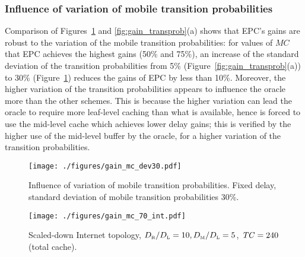 \documentclass[conference]{IEEEtran}
\newcommand{\mynote}[1]{{{\medskip
\footnotesize \em \noindent Note: #1}}\medskip}
\newcommand{\mynotex}[1]{}
\renewcommand{\mynote}[1]{}
\newcommand{\M}{\mbox{\tiny M}}
\newcommand{\Leaf}{\mbox{\tiny L}}
\newcommand{\R}{\mbox{\tiny R}}
\newcommand{\TC}{\mbox{\emph{TC}}}
\begin{document}
\mynotex{
\begin{itemize}
\item how is gain estimated in the transient graph: average of delays then take ratio to get gain
\item identify when 95\% of steady state value is reached: approx 750 for $\gamma=0.5$ and 490 for $\gamma=8$
\end{itemize}
}

\subsubsection{Influence of variation of mobile transition probabilities} Comparison of Figures~\ref{fig:gain_var_trans} and \ref{fig:gain_transprob}(a) shows that  EPC's   gains  are robust to the variation of the mobile transition probabilities: for values of $MC$ that EPC achieves the highest gains (50\% and 75\%), an increase of the standard deviation of the  transition probabilities from 5\% (Figure~\ref{fig:gain_transprob}(a)) to 30\% (Figure~\ref{fig:gain_var_trans}) reduces the gains of EPC by less than 10\%.
 Moreover, the higher variation of the  transition probabilities appears to influence the oracle  more than the other schemes.
This is because the higher variation can lead the oracle to require more leaf-level caching than what is  available, hence is forced to use the mid-level cache which achieves lower delay gains; this is verified by the higher use of the mid-level buffer by the oracle, for a higher variation of the transition probabilities.


\mynote{
\begin{itemize}
\item Add note that this is verified by the increased utilization of the mid-level cache for the oracle.
\end{itemize}
}


\begin{figure}[tb]
\centering
\texttt{[image: ./figures/gain\_mc\_dev30.pdf]}
\vspace{-0.1in}
\caption{Influence of variation of mobile transition probabilities. Fixed delay, standard deviation of mobile transition probabilities $30\%$.}
\label{fig:gain_var_trans}
\end{figure}


\begin{figure}[tb]
\vspace{-0.05in}
\centering
\texttt{[image: ./figures/gain\_mc\_70\_int.pdf]}
\vspace{-0.1in}
\caption{Scaled-down Internet topology, $D_{\R}/D_{\Leaf}=10, D_{\M}/D_{\Leaf}=5$, $\TC=240$ (total cache).}
\label{fig:gain_70_int}
\vspace{-0.3in}
\end{figure}
\end{document}
